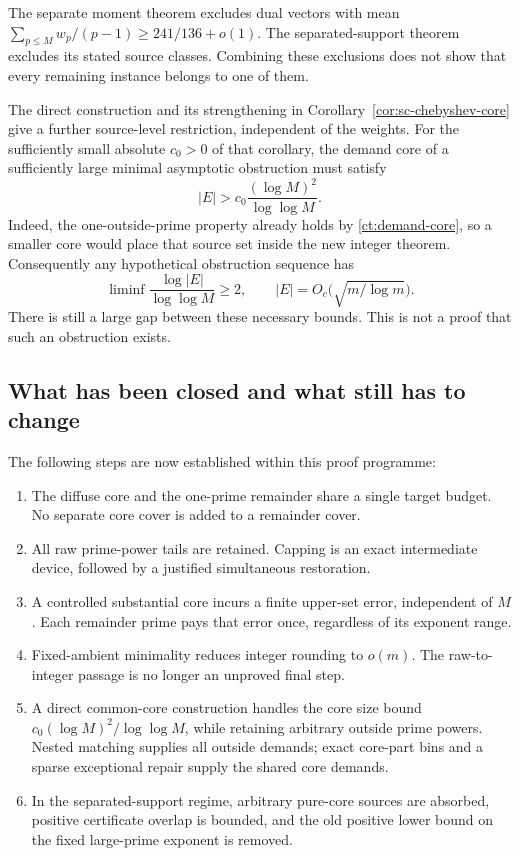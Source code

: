 The separate moment theorem excludes dual vectors with mean
\(\sum_{p\le M}w_p/(p-1)\ge241/136+o(1)\).
The separated-support theorem excludes its stated source classes.
Combining these exclusions does not show that every remaining
instance belongs to one of them.

The direct construction and its strengthening in
Corollary~\ref{cor:sc-chebyshev-core} give a further source-level
restriction, independent of the weights. For the sufficiently
small absolute \(c_0>0\) of that corollary, the demand core of a
sufficiently large minimal asymptotic obstruction must satisfy
\[
 |E|>c_0\frac{(\log M)^2}{\log\log M}.
\]
Indeed, the one-outside-prime property already holds by
\eqref{ct:demand-core}, so a smaller core would place that source
set inside the new integer theorem. Consequently any hypothetical
obstruction sequence has
\[
 \liminf\frac{\log|E|}{\log\log M}\ge2,
 \qquad |E|=O_c\bigl(\sqrt{m/\log m}\bigr).
\]
There is still a large gap between these necessary bounds. This is
not a proof that such an obstruction exists.

\subsection{What has been closed and what still has to change}

The following steps are now established within this proof programme:

\begin{enumerate}
\item The diffuse core and the one-prime remainder share a single
target budget. No separate core cover is added to a remainder cover.
\item All raw prime-power tails are retained. Capping is an exact
intermediate device, followed by a justified simultaneous restoration.
\item A controlled substantial core incurs a finite upper-set error,
independent of \(M\). Each remainder prime pays that error once,
regardless of its exponent range.
\item Fixed-ambient minimality reduces integer rounding to \(o(m)\).
The raw-to-integer passage is no longer an unproved final step.
\item A direct common-core construction handles the core size
bound \(c_0(\log M)^2/\log\log M\), while retaining arbitrary
outside prime powers. Nested matching supplies all outside demands;
exact core-part bins and a sparse exceptional repair supply the
shared core demands.
\item In the separated-support regime, arbitrary pure-core sources
are absorbed, positive certificate overlap is bounded, and the
old positive lower bound on the fixed large-prime exponent is removed.
\end{enumerate}

